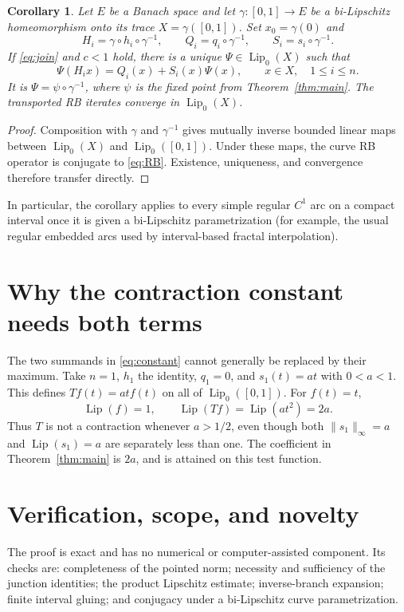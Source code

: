 \documentclass[11pt]{article}
\newtheorem{corollary}[theorem]{Corollary}
\newcommand{\Lip}{\operatorname{Lip}}
\newcommand{\Lipz}{\operatorname{Lip}_0}
\begin{document}
\begin{corollary}\label{cor:curve}
Let $E$ be a Banach space and let
$\gamma:[0,1]\to E$ be a bi-Lipschitz homeomorphism onto its trace
$X=\gamma([0,1])$.  Set $x_0=\gamma(0)$ and
\[
 H_i=\gamma\circ h_i\circ\gamma^{-1},\qquad
 Q_i=q_i\circ\gamma^{-1},\qquad S_i=s_i\circ\gamma^{-1}.
\]
If \eqref{eq:join} and $c<1$ hold, there is a unique
$\Psi\in\Lipz(X)$ such that
\[
 \Psi(H_i x)=Q_i(x)+S_i(x)\Psi(x),
 \qquad x\in X,\quad 1\leq i\leq n.
\]
It is $\Psi=\psi\circ\gamma^{-1}$, where $\psi$ is the fixed point from
Theorem~\ref{thm:main}.  The transported RB iterates converge in
$\Lipz(X)$.
\end{corollary}

\begin{proof}
Composition with $\gamma$ and $\gamma^{-1}$ gives mutually inverse bounded
linear maps between $\Lipz(X)$ and $\Lipz([0,1])$.  Under these maps, the
curve RB operator is conjugate to \eqref{eq:RB}.  Existence, uniqueness, and
convergence therefore transfer directly.
\end{proof}

In particular, the corollary applies to every simple regular $C^1$ arc on a
compact interval once it is given a bi-Lipschitz parametrization (for example,
the usual regular embedded arcs used by interval-based fractal interpolation).

\section*{Why the contraction constant needs both terms}

The two summands in \eqref{eq:constant} cannot generally be replaced by their
maximum.  Take $n=1$, $h_1$ the identity, $q_1=0$, and
$s_1(t)=a t$ with $0<a<1$.  This defines $Tf(t)=atf(t)$ on all of
$\Lipz([0,1])$.  For $f(t)=t$,
\[
 \Lip(f)=1,
 \qquad
 \Lip(Tf)=\Lip(at^2)=2a.
\]
Thus $T$ is not a contraction whenever $a>1/2$, even though both
$\|s_1\|_\infty=a$ and $\Lip(s_1)=a$ are separately less than one.  The
coefficient in Theorem~\ref{thm:main} is $2a$, and is attained on this test
function.

\section*{Verification, scope, and novelty}

The proof is exact and has no numerical or computer-assisted component.  Its
checks are: completeness of the pointed norm; necessity and sufficiency of the
junction identities; the product Lipschitz estimate; inverse-branch expansion;
finite interval gluing; and conjugacy under a bi-Lipschitz curve
parametrization.
\end{document}
